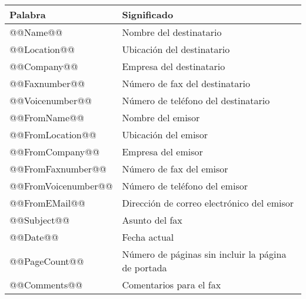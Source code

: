 \documentclass[a4paper,10pt]{scrartcl}
\begin{document}
\begin{center}
\begin{tabular}{|l|l|}
\hline
\bfseries Palabra & \bfseries Significado \\
\hline\hline
\ttfamily @@Name@@ & Nombre del destinatario \\\hline
\ttfamily @@Location@@ & Ubicación del destinatario \\\hline
\ttfamily @@Company@@ & Empresa del destinatario \\\hline
\ttfamily @@Faxnumber@@ & Número de fax del destinatario \\\hline
\ttfamily @@Voicenumber@@ & Número de teléfono del destinatario \\\hline
\ttfamily @@FromName@@ & Nombre del emisor \\\hline
\ttfamily @@FromLocation@@ & Ubicación del emisor \\\hline
\ttfamily @@FromCompany@@ & Empresa del emisor \\\hline
\ttfamily @@FromFaxnumber@@ & Número de fax del emisor \\\hline
\ttfamily @@FromVoicenumber@@ & Número de teléfono del emisor \\\hline
\ttfamily @@FromEMail@@ & Dirección de correo electrónico del emisor \\\hline
\ttfamily @@Subject@@ & Asunto del fax \\\hline
\ttfamily @@Date@@ & Fecha actual \\\hline
\ttfamily @@PageCount@@ & Número de páginas sin incluir la página de portada \\\hline
\ttfamily @@Comments@@ & Comentarios para el fax \\\hline
\end{tabular}
\end{center}
\end{document}
